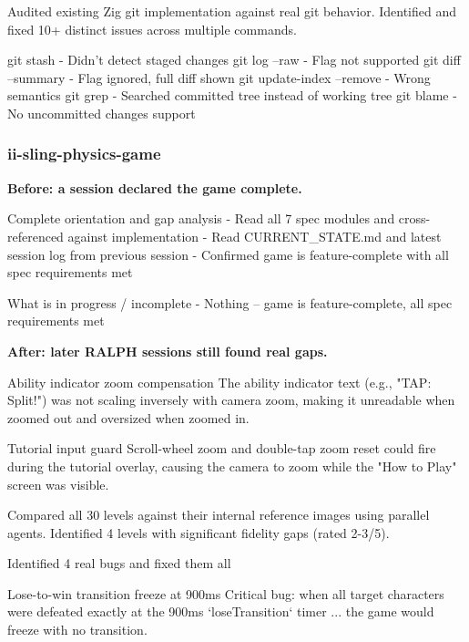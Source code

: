 \documentclass[11pt,a4paper]{article}
\begin{document}
\begin{cbox}
Audited existing Zig git implementation against real git behavior.
Identified and fixed 10+ distinct issues across multiple commands.

git stash       - Didn't detect staged changes
git log --raw   - Flag not supported
git diff --summary - Flag ignored, full diff shown
git update-index --remove - Wrong semantics
git grep        - Searched committed tree instead of working tree
git blame       - No uncommitted changes support
\end{cbox}

\subsubsection{ii-sling-physics-game}

\textbf{Before: a session declared the game complete.}

\begin{cbox}
Complete orientation and gap analysis
- Read all 7 spec modules and cross-referenced against implementation
- Read CURRENT_STATE.md and latest session log from previous session
- Confirmed game is feature-complete with all spec requirements met
\end{cbox}

\begin{cbox}
What is in progress / incomplete
- Nothing -- game is feature-complete, all spec requirements met
\end{cbox}

\textbf{After: later RALPH sessions still found real gaps.}

\begin{cbox}
Ability indicator zoom compensation
The ability indicator text (e.g., "TAP: Split!") was not scaling inversely
with camera zoom, making it unreadable when zoomed out and oversized when zoomed in.

Tutorial input guard
Scroll-wheel zoom and double-tap zoom reset could fire during the tutorial overlay,
causing the camera to zoom while the "How to Play" screen was visible.

Compared all 30 levels against their internal reference images using parallel agents.
Identified 4 levels with significant fidelity gaps (rated 2-3/5).
\end{cbox}

\begin{cbox}
Identified 4 real bugs and fixed them all

Lose-to-win transition freeze at 900ms
Critical bug: when all target characters were defeated exactly at the 900ms `loseTransition`
timer ... the game would freeze with no transition.
\end{cbox}
\end{document}

